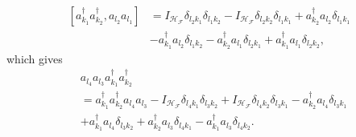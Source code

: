 \documentclass[aps,preprint]{revtex4}%
\begin{document}
\bigskip%

\begin{align}
\left[  a_{k_{1}}^{\dagger}a_{k_{2}}^{\dagger},a_{l_{2}}a_{l_{1}}\right]   &
=I_{\mathcal{H}_{\mathcal{F}}}\delta_{l_{2}k_{1}}\delta_{l_{1}k_{2}%
}-I_{\mathcal{H}_{\mathcal{F}}}\delta_{l_{2}k_{2}}\delta_{l_{1}k_{1}}%
+a_{k_{2}}^{\dagger}a_{l_{2}}\delta_{l_{1}k_{1}}\nonumber\\
&  -a_{k_{1}}^{\dagger}a_{l_{2}}\delta_{l_{1}k_{2}}-a_{k_{2}}^{\dagger
}a_{l_{1}}\delta_{l_{2}k_{1}}+a_{k_{1}}^{\dagger}a_{l_{1}}\delta_{l_{2}k_{2}},
\end{align}
which gives%
\begin{align}
&  a_{l_{4}}a_{l_{3}}a_{k_{1}}^{\dagger}a_{k_{2}}^{\dagger}\nonumber\\
&  =a_{k_{1}}^{\dagger}a_{k_{2}}^{\dagger}a_{l_{4}}a_{l_{3}}-I_{\mathcal{H}%
_{\mathcal{F}}}\delta_{l_{4}k_{1}}\delta_{l_{3}k_{2}}+I_{\mathcal{H}%
_{\mathcal{F}}}\delta_{l_{4}k_{2}}\delta_{l_{3}k_{1}}-a_{k_{2}}^{\dagger
}a_{l_{4}}\delta_{l_{3}k_{1}}\nonumber\\
&  +a_{k_{1}}^{\dagger}a_{l_{4}}\delta_{l_{3}k_{2}}+a_{k_{2}}^{\dagger
}a_{l_{3}}\delta_{l_{4}k_{1}}-a_{k_{1}}^{\dagger}a_{l_{3}}\delta_{l_{4}k_{2}}.
\end{align}


\bigskip

\bigskip
\end{document}
